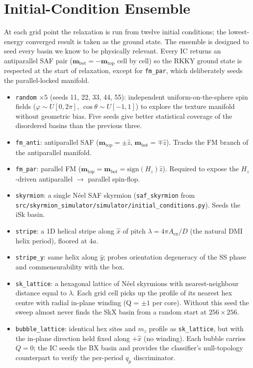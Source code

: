 \documentclass[11pt,a4paper]{article}
\newcommand{\mb}[1]{\mathbf{#1}}
\newcommand{\zhat}{\hat{z}}
\newcommand{\Aex}{A_{\text{ex}}}
\begin{document}
\section{Initial-Condition Ensemble}

At each grid point the relaxation is run from twelve
initial conditions; the lowest-energy converged result is
taken as the ground state. The ensemble is designed to
seed every basin we know to be physically relevant. Every
IC returns an antiparallel SAF pair
($\mb{m}_{\text{bot}} = -\mb{m}_{\text{top}}$ cell by
cell) so the RKKY ground state is respected at the start
of relaxation, except for \texttt{fm\_par}, which
deliberately seeds the parallel-locked manifold.
%
\begin{itemize}[nosep]
\item \texttt{random} $\times 5$ (seeds 11, 22, 33, 44, 55):
    independent uniform-on-the-sphere spin fields
    ($\varphi \sim U[0, 2\pi]$, $\cos\theta \sim U[-1, 1]$)
    to explore the texture manifold without geometric
    bias. Five seeds give better statistical coverage
    of the disordered basins than the previous three.
\item \texttt{fm\_anti}: antiparallel SAF
    ($\mb{m}_{\text{top}} = \pm\zhat$,
    $\mb{m}_{\text{bot}} = \mp\zhat$). Tracks the FM
    branch of the antiparallel manifold.
\item \texttt{fm\_par}: parallel FM
    ($\mb{m}_{\text{top}} = \mb{m}_{\text{bot}} =
    \text{sign}(H_z) \zhat$). Required to expose the
    $H_z$-driven antiparallel $\to$ parallel spin-flop.
\item \texttt{skyrmion}: a single N\'{e}el SAF skyrmion
    (\texttt{saf\_skyrmion} from
    \texttt{src/skyrmion\_simulator/simulator/initial\_conditions.py}). Seeds
    the iSk basin.
\item \texttt{stripe}: a 1D helical stripe along $\hat{x}$
    of pitch $\lambda = 4\pi \Aex / D$ (the natural DMI
    helix period), floored at $4a$.
\item \texttt{stripe\_y}: same helix along $\hat{y}$;
    probes orientation degeneracy of the SS phase and
    commensurability with the box.
\item \texttt{sk\_lattice}: a hexagonal lattice of
    N\'{e}el skyrmions with nearest-neighbour distance
    equal to $\lambda$. Each grid cell picks up the
    profile of its nearest hex centre with radial in-plane
    winding (Q = $\pm 1$ per core). Without this seed the
    sweep almost never finds the SkX basin from a random
    start at $256 \times 256$.
\item \texttt{bubble\_lattice}: identical hex sites and
    $m_z$ profile as \texttt{sk\_lattice}, but with the
    in-plane direction held fixed along $+\hat{x}$ (no
    winding). Each bubble carries $Q = 0$; the IC seeds
    the BX basin and provides the classifier's
    null-topology counterpart to verify the per-period
    $q_p$ discriminator.
\end{itemize}
\end{document}
